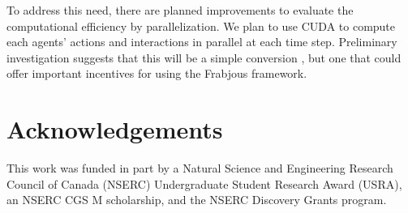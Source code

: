 \documentclass{sig-alternate}
\begin{document}
To address this need, there are planned improvements to evaluate the computational efficiency by parallelization. We plan to use CUDA to compute each agents' actions and interactions in parallel at each time step. Preliminary investigation suggests that this will be a simple conversion \cite{dphaskell}, but one that could offer important incentives for using the Frabjous framework.

\section{Acknowledgements}
This work was funded in part by a Natural Science and Engineering Research Council of Canada (NSERC) Undergraduate Student Research Award (USRA), an NSERC CGS M scholarship, and the NSERC Discovery Grants program.

%

\setlength{\bibsep}{0.5ex}





%
\end{document}
